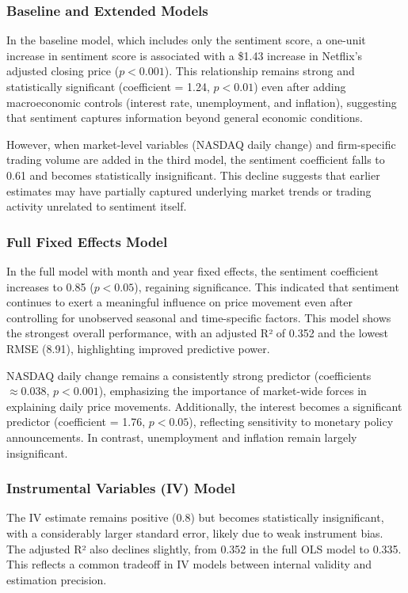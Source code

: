 \documentclass[12pt]{article}
\begin{document}
\subsubsection{Baseline and Extended Models
}
In the baseline model, which includes only the sentiment score, a one-unit increase in sentiment score is associated with a \$1.43 increase in Netflix’s adjusted closing price ($p < 0.001$). This relationship remains strong and statistically significant (coefficient = 1.24, $p < 0.01$)  even after adding macroeconomic controls (interest rate, unemployment, and inflation), suggesting that sentiment captures information beyond general economic conditions.

However, when market-level variables (NASDAQ daily change) and firm-specific trading volume are added in the third model, the sentiment coefficient falls to 0.61 and becomes statistically insignificant. This decline suggests that earlier estimates may have partially captured underlying market trends or trading activity unrelated to sentiment itself.

\subsubsection{Full Fixed Effects Model
}
In the full model with month and year fixed effects, the sentiment coefficient increases to 0.85 ($p < 0.05$), regaining significance. This indicated that sentiment continues to exert a meaningful influence on price movement even after controlling for unobserved seasonal and time-specific factors. This model shows the strongest overall performance, with an adjusted R² of 0.352 and the lowest RMSE (8.91), highlighting improved predictive power.

NASDAQ daily change remains a consistently strong predictor (coefficients $\approx 0.038$, $p < 0.001$), emphasizing the importance of market-wide forces in explaining daily price movements. Additionally, the interest becomes a significant predictor (coefficient = 1.76, $p < 0.05$),  reflecting sensitivity to monetary policy announcements. In contrast, unemployment and inflation remain largely insignificant.

\subsubsection{Instrumental Variables (IV) Model
}
The IV estimate remains positive (0.8) but becomes statistically insignificant, with a considerably larger standard error, likely due to weak instrument bias. The adjusted R² also declines slightly, from 0.352 in the full OLS model to 0.335. This reflects a common tradeoff in IV models between internal validity and estimation precision. 
\end{document}
